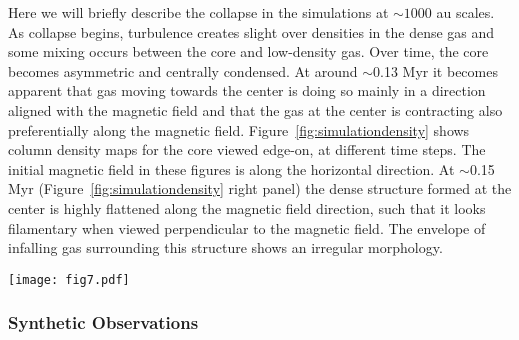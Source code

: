 \documentclass[iop]{emulateapj}
\begin{document}
Here we will briefly describe the collapse in the simulations at $\sim1000$ au scales. As collapse begins, turbulence creates slight over densities in the dense gas and some mixing occurs between the core and low-density gas. Over time, the core becomes asymmetric and centrally condensed. At around $\sim$0.13 Myr it becomes apparent that gas moving towards the center is doing so mainly in a direction aligned with the magnetic field and that the gas at the center is contracting also preferentially along the magnetic field. Figure~\ref{fig:simulationdensity} shows column density maps for the core viewed edge-on, at different time steps. The initial magnetic field in these figures is along the horizontal direction. At $\sim$0.15 Myr (Figure~\ref{fig:simulationdensity} right panel) the dense structure formed at the center is highly flattened along the magnetic field direction, such that it looks filamentary when viewed perpendicular to the magnetic field. The envelope of infalling gas surrounding this structure shows an irregular morphology.


\begin{figure*}
\centering
\texttt{[image: fig7.pdf]}
\caption{Simulation column density maps for the core at 3 different times, viewed edge-on. The sink particle location, after it forms, is marked on the right-most panel. The magnetic field is mainly along the horizontal direction.\\
\label{fig:simulationdensity}}
\end{figure*}

\subsubsection{Synthetic Observations}
\end{document}
